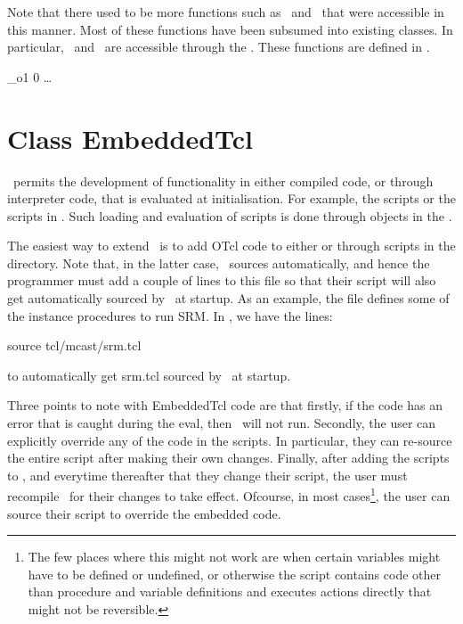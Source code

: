 Note that there used to be more functions such as \ and
\ that were accessible in this manner.
Most of these functions have been subsumed into existing classes.
In particular, \ and \ are accessible
through the
.
These functions are defined in .
\begin{program}
            _o1
            0
            \ldots
\end{program}
          

\section{Class EmbeddedTcl}
\label{sec:EmbeddedTcl}

\ns\ permits the development of functionality in either compiled code,
or through interpreter code, that is evaluated at initialisation.
For example, the scripts  or the scripts in
.
Such loading and evaluation of scripts is done through objects in the
.

The easiest way to extend \ns\ is to add OTcl code
to either  or through scripts
in the  directory.
Note that, in the latter case, \ns\ sources
 automatically, and hence
the programmer must add a couple of lines to this file
so that their script will also get automatically sourced by \ns\
at startup.
As an example,
the file  defines some of the instance procedures
to run SRM.
In , we have the lines:
\begin{program}
	source tcl/mcast/srm.tcl
\end{program}
to automatically get srm.tcl sourced by \ns\ at startup.

Three points to note with EmbeddedTcl code are that
firstly, if the code has an error that is caught during the eval,
then \ns\ will not run.
Secondly, the user can explicitly override any of the code in the scripts.
In particular, they can re-source the entire script after making their own
changes. 
Finally, after adding the scripts to , and
everytime thereafter that they change their script, the user
must recompile \ns\ for their changes to take effect.
Ofcourse, in most cases\footnote{%
The few places where this might not work
are when certain variables might have to be defined or undefined,
or otherwise the script contains code
other than procedure and variable definitions and 
executes actions directly that might not be reversible.},
the user can source their script
to override the embedded code.


